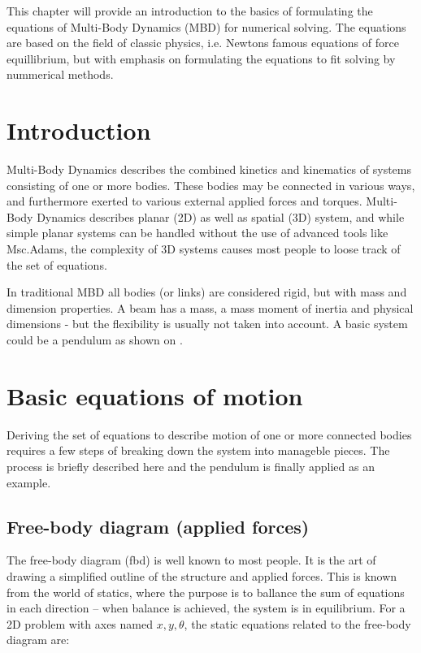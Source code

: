 \par	This chapter will provide an introduction to the basics of formulating the equations of Multi-Body Dynamics
	(MBD) for numerical solving. The equations are based on the field of classic physics, i.e. Newtons famous equations
	of force equillibrium, but with emphasis on formulating the equations to fit solving by nummerical methods.
	
\section{Introduction}	
\par Multi-Body Dynamics describes the combined kinetics and kinematics of systems consisting of one or more bodies.
	These bodies may be connected in various ways, and furthermore exerted to various external applied forces and 
	torques. Multi-Body Dynamics describes planar (2D) as well as spatial (3D) system, and while simple planar 
	systems can be handled without the use of advanced tools like Msc.Adams, the complexity of 3D systems 
	causes most people to loose track of the set of equations.
\par In traditional MBD all bodies (or links) are considered rigid, but with mass and dimension properties. A 
	beam has a mass, a mass moment of inertia and physical dimensions - but the flexibility is usually not 
	taken into account. A basic system could be a pendulum as shown on .
	
\section{Basic equations of motion}
\par Deriving the set of equations to describe motion of one or more connected bodies requires a few steps of
	breaking down the system into manageble pieces. The process is briefly described here and the pendulum is finally
	applied as an example.

\subsection{Free-body diagram (applied forces)}
\par The free-body diagram (fbd) is well known to most people. It is the art of drawing a simplified outline of the
	structure and applied forces. This is known from the world of statics, where the purpose is to ballance the
	sum of equations in each direction -- when balance is achieved, the system is in equilibrium. For a 2D problem
	with axes named $x,y,\theta$, the static equations related to the free-body diagram are:

